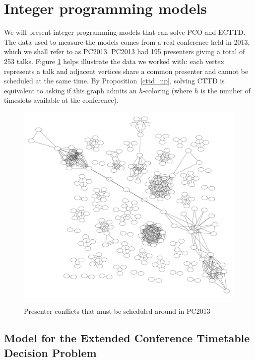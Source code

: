 \documentclass{svjour3}                     %
\begin{document}
\section{Integer programming models}\label{sec.model}

We will present integer programming models that can solve PCO and ECTTD. 
The data used to measure the models comes from a real conference held in 2013, which we shall refer to as PC2013. 
PC2013 had 195 presenters giving a total of 253 talks. 
Figure \ref{fig_pc2013_graph} helps illustrate the data we worked with: each vertex represents a talk and adjacent vertices share a common presenter and cannot be scheduled at the same time. 
By Proposition~\ref{cttd_np}, solving CTTD is equivalent to asking if this graph admits an $h$-coloring (where $h$ is the number of timeslots available at the conference).
\begin{figure}[h!]
	\caption{Presenter conflicts that must be scheduled around in PC2013}
	\centering
	\includegraphics[width=\textwidth]{penguiconconflict}
	\vspace{-.5in}
	\label{fig_pc2013_graph}
\end{figure}

\subsection{Model for the Extended Conference Timetable Decision Problem}
\end{document}
